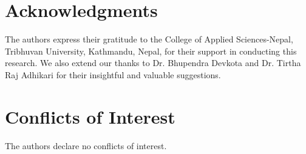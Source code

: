 \documentclass[a4paper,12pt]{article}
\begin{document}
\section*{Acknowledgments}
The authors express their gratitude to the College of Applied Sciences-Nepal, Tribhuvan University, Kathmandu, Nepal, for their support in conducting this research. We also extend our thanks to Dr. Bhupendra Devkota and Dr. Tirtha Raj Adhikari for their insightful and valuable suggestions.


\section*{Conflicts of Interest}
The authors declare no conflicts of interest.



\end{document}
